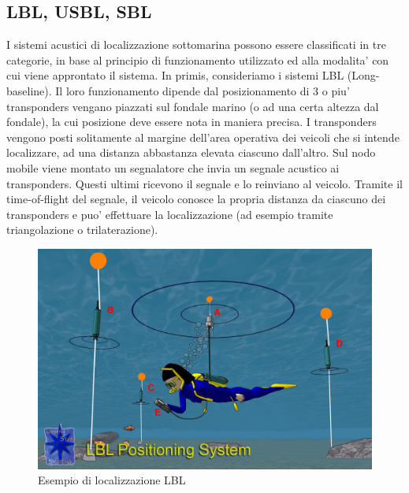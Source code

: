 \documentclass[Lau,binding=0.6cm]{sapthesis}
\begin{document}
\subsection{LBL, USBL, SBL}
I sistemi acustici di localizzazione sottomarina possono essere classificati in tre categorie, in base al principio di funzionamento utilizzato ed alla modalita' con cui viene approntato il sistema. \cite{underwaterpositioning} \newline
In primis, consideriamo i sistemi LBL (Long-baseline).  Il loro funzionamento dipende dal posizionamento di 3 o piu' transponders vengano piazzati sul fondale marino (o ad una certa altezza dal fondale), la cui posizione deve essere nota in maniera precisa. 
I transponders vengono posti solitamente al margine dell'area operativa dei veicoli che si intende localizzare, ad una distanza abbastanza elevata ciascuno dall'altro. Sul nodo mobile viene montato un segnalatore che invia un segnale acustico ai transponders. Questi ultimi ricevono il segnale e lo reinviano al veicolo. Tramite il time-of-flight del segnale, il veicolo conosce la propria distanza da ciascuno dei transponders e puo' effettuare la localizzazione (ad esempio tramite triangolazione o trilaterazione).

\begin{figure}[H]
    \centering
	\includegraphics[scale=0.25]{LBL.jpg}
	\caption{ Esempio di localizzazione LBL}
	\label{fig:LBL}
\end{figure}
\newpage
\end{document}
